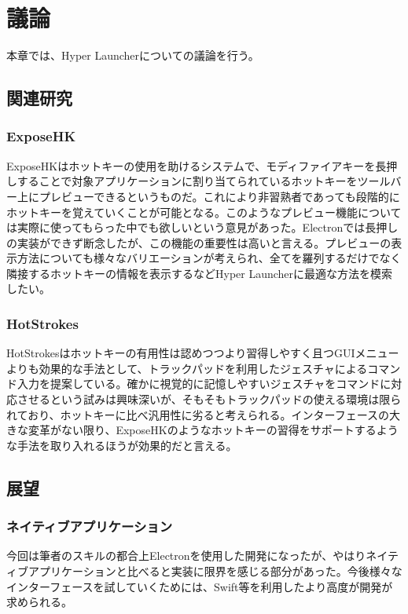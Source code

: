 \chapter{議論}
本章では、Hyper Launcherについての議論を行う。

\newpage

\section{関連研究}

\subsection{ExposeHK}
ExposeHK\cite{exposehk}はホットキーの使用を助けるシステムで、モディファイアキーを長押しすることで対象アプリケーションに割り当てられているホットキーをツールバー上にプレビューできるというものだ。これにより非習熟者であっても段階的にホットキーを覚えていくことが可能となる。このようなプレビュー機能については実際に使ってもらった中でも欲しいという意見があった。Electronでは長押しの実装ができず断念したが、この機能の重要性は高いと言える。プレビューの表示方法についても様々なバリエーションが考えられ、全てを羅列するだけでなく隣接するホットキーの情報を表示するなどHyper Launcherに最適な方法を模索したい。

\subsection{HotStrokes}
HotStrokes\cite{hotstrokes}はホットキーの有用性は認めつつより習得しやすく且つGUIメニューよりも効果的な手法として、トラックパッドを利用したジェスチャによるコマンド入力を提案している。確かに視覚的に記憶しやすいジェスチャをコマンドに対応させるという試みは興味深いが、そもそもトラックパッドの使える環境は限られており、ホットキーに比べ汎用性に劣ると考えられる。インターフェースの大きな変革がない限り、ExposeHKのようなホットキーの習得をサポートするような手法を取り入れるほうが効果的だと言える。

\section{展望}

\subsection{ネイティブアプリケーション}
今回は筆者のスキルの都合上Electronを使用した開発になったが、やはりネイティブアプリケーションと比べると実装に限界を感じる部分があった。今後様々なインターフェースを試していくためには、Swift等を利用したより高度が開発が求められる。

